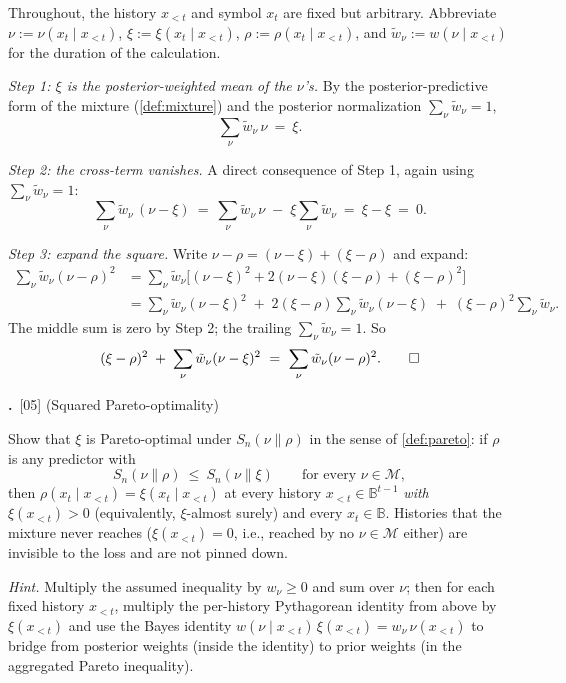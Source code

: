 \documentclass[fontsize=11pt, parskip=half]{scrartcl}
\theoremstyle{definition}
\newenvironment{solution}{%
    \begin{tcolorbox}[colback=black!5!white, colframe=black!50!white,
      title={\textbf{Solution}}, fonttitle=\normalfont, breakable]
  }{\end{tcolorbox}}
\newenvironment{solution}{\expandafter\comment}{\expandafter\endcomment}
\newcommand{\mysubsection}[2]{\par\medskip\noindent\refstepcounter{subsection}\textbf{\thesubsection.}~#2\par\smallskip}
\newcommand{\Mc}{\mathcal{M}}
\newcommand{\Sn}[2]{S_{n}(#1 \parallel #2)}
\begin{document}
\begin{solution}
Throughout, the history $x_{<t}$ and symbol $x_t$ are fixed but arbitrary.
Abbreviate $\nu := \nu(x_t \mid x_{<t})$, $\xi := \xi(x_t \mid x_{<t})$,
$\rho := \rho(x_t \mid x_{<t})$, and $\tilde w_\nu := w(\nu \mid x_{<t})$ for
the duration of the calculation.

\medskip
\textit{Step 1: $\xi$ is the posterior-weighted mean of the $\nu$'s.}
By the posterior-predictive form of the mixture (\cref{def:mixture}) and the
posterior normalization $\sum_\nu \tilde w_\nu = 1$,
\[
  \sum_\nu \tilde w_\nu \, \nu ~=~ \xi.
\]

\medskip
\textit{Step 2: the cross-term vanishes.}
A direct consequence of Step 1, again using $\sum_\nu \tilde w_\nu = 1$:
\[
  \sum_\nu \tilde w_\nu \, (\nu - \xi)
  ~=~ \sum_\nu \tilde w_\nu \, \nu \;-\; \xi \sum_\nu \tilde w_\nu
  ~=~ \xi - \xi ~=~ 0.
\]

\medskip
\textit{Step 3: expand the square.}
Write $\nu - \rho = (\nu - \xi) + (\xi - \rho)$ and expand:
\begin{align*}
\sum_\nu \tilde w_\nu (\nu - \rho)^2
  &= \sum_\nu \tilde w_\nu\bigl[(\nu - \xi)^2 + 2(\nu - \xi)(\xi - \rho) + (\xi - \rho)^2\bigr] \\
  &= \sum_\nu \tilde w_\nu (\nu - \xi)^2
     \;+\; 2(\xi - \rho)\sum_\nu \tilde w_\nu (\nu - \xi)
     \;+\; (\xi - \rho)^2 \sum_\nu \tilde w_\nu.
\end{align*}
The middle sum is zero by Step 2; the trailing $\sum_\nu \tilde w_\nu = 1$. So
\[
  (\xi - \rho)^2 \;+\; \sum_\nu \tilde w_\nu (\nu - \xi)^2
  ~=~ \sum_\nu \tilde w_\nu (\nu - \rho)^2. \qedhere
\]
\end{solution}

\mysubsection{2}{[05] (Squared Pareto-optimality)\label{prob:sq_pareto}}

Show that $\xi$ is Pareto-optimal under $\Sn{\nu}{\rho}$ in the sense of \cref{def:pareto}: if $\rho$ is any predictor with
\[
  \Sn{\nu}{\rho} ~\leq~ \Sn{\nu}{\xi} \qquad \text{for every } \nu \in \Mc,
\]
then $\rho(x_t \mid x_{<t}) = \xi(x_t \mid x_{<t})$ at every history $x_{<t} \in
\mathbb{B}^{t-1}$ \emph{with $\xi(x_{<t}) > 0$} (equivalently, $\xi$-almost
surely) and every $x_t \in \mathbb{B}$. Histories that the mixture never reaches
($\xi(x_{<t}) = 0$, i.e., reached by no $\nu \in \Mc$ either) are invisible
to the loss and are not pinned down.

\textit{Hint.} Multiply the assumed inequality by $w_\nu \geq 0$ and sum over
$\nu$; then for each fixed history $x_{<t}$, multiply the per-history
Pythagorean identity from above by $\xi(x_{<t})$ and use the Bayes identity
$w(\nu \mid x_{<t})\,\xi(x_{<t}) = w_\nu \,\nu(x_{<t})$ to bridge from posterior
weights (inside the identity) to prior weights (in the aggregated Pareto
inequality).
\end{document}
